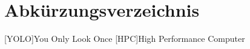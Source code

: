 \chapter{Abkürzungsverzeichnis} 
\begin{acronym}
    [YOLO]{You Only Look Once}
    [HPC]{High Performance Computer}
\end{acronym}